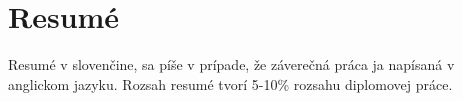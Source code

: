 \chapter{Resumé}
\label{ch:resume}

Resumé v slovenčine, sa píše v prípade, že záverečná práca ja napísaná v 
anglickom jazyku. Rozsah resumé tvorí 5-10\% rozsahu diplomovej práce.